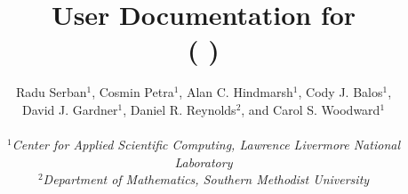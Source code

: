 \documentclass[twoside,openright,10pt]{report}
\title{User Documentation for {\idas} {\idasrelease} \\
  ({\sundials} {\sunrelease})}
\author{
  Radu Serban$^1$,
  Cosmin Petra$^1$,
  Alan C. Hindmarsh$^1$,
  Cody J. Balos$^1$,\\
  David J. Gardner$^1$,
  Daniel R. Reynolds$^2$, and
  Carol S. Woodward$^1$ \\
  \\
  {\em $^1$Center for Applied Scientific Computing, Lawrence Livermore National Laboratory} \\
  {\em $^2$Department of Mathematics, Southern Methodist University}
}
\date{
  \today
  \vfill
  {\centerline{\texttt{[image: doc\_logo\_blue]}}}
  \vfill \idaucrlug
}
\begin{document}
\frontug
\renewcommand{\chaptermark}[1]{\markboth{#1}{}}
\renewcommand{\sectionmark}[1]{\markright{\thesection\ #1}}


\clearemptydoublepage

\clearemptydoublepage

\clearemptydoublepage

\clearemptydoublepage

\clearemptydoublepage

\clearemptydoublepage

\clearemptydoublepage

\clearemptydoublepage

\clearemptydoublepage

\clearemptydoublepage

\clearemptydoublepage

\clearemptydoublepage

\clearemptydoublepage
\appendix

\clearemptydoublepage

\clearemptydoublepage

\clearemptydoublepage


\clearemptydoublepage
\printindex
\clearemptydoublepage
\end{document}
